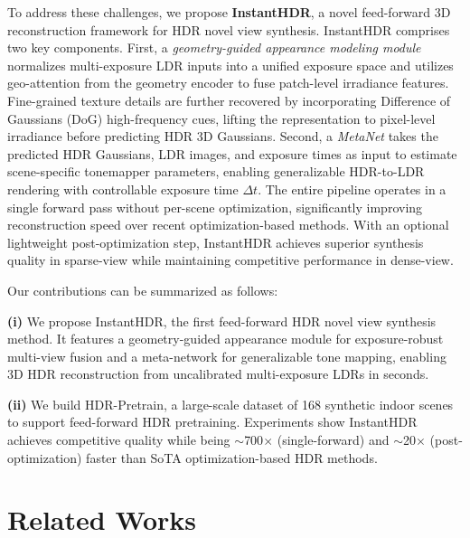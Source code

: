 \documentclass[runningheads]{llncs}
\begin{document}
To address these challenges, we propose \textbf{InstantHDR}, a novel feed-forward 3D reconstruction framework for HDR novel view synthesis. InstantHDR comprises two key components. First, a \textit{geometry-guided appearance modeling module} normalizes multi-exposure LDR inputs into a unified exposure space and utilizes geo-attention from the geometry encoder to fuse patch-level irradiance features. Fine-grained texture details are further recovered by incorporating Difference of Gaussians (DoG) high-frequency cues, lifting the representation to pixel-level irradiance before predicting HDR 3D Gaussians. Second, a \textit{MetaNet} takes the predicted HDR Gaussians, LDR images, and exposure times as input to estimate scene-specific tonemapper parameters, enabling generalizable HDR-to-LDR rendering with controllable exposure time $\Delta t$. The entire pipeline operates in a single forward pass without per-scene optimization, significantly improving reconstruction speed over recent optimization-based methods. With an optional lightweight post-optimization step, InstantHDR achieves superior synthesis quality in sparse-view while maintaining competitive performance in dense-view.



Our contributions can be summarized as follows:



\textbf{(i)} 
We propose InstantHDR, the first feed-forward HDR novel view synthesis method. It features a geometry-guided appearance module for exposure-robust multi-view fusion and a meta-network for generalizable tone mapping, enabling 3D HDR reconstruction from uncalibrated multi-exposure LDRs in seconds.

\textbf{(ii)} 
We build HDR-Pretrain, a large-scale dataset of 168 synthetic indoor scenes to support feed-forward HDR pretraining. 
Experiments show InstantHDR achieves competitive quality while being $\sim$700$\times$ (single-forward) and $\sim$20$\times$ (post-optimization) faster than SoTA optimization-based HDR methods.

\section{Related Works}
\end{document}
